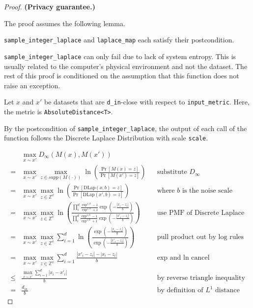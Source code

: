 \documentclass{article}
\begin{document}
\begin{proof} 
\textbf{(Privacy guarantee.)} 
    
\begin{tcolorbox}
    The proof assumes the following lemma.
    \begin{lemma}
        \texttt{sample\_integer\_laplace} and \texttt{laplace\_map} each satisfy their postcondition.
    \end{lemma}
\end{tcolorbox}

\texttt{sample\_integer\_laplace} can only fail due to lack of system entropy. 
This is usually related to the computer's physical environment and not the dataset. 
The rest of this proof is conditioned on the assumption that this function does not raise an exception. 

Let $x$ and $x'$ be datasets that are \texttt{d\_in}-close with respect to \texttt{input\_metric}.
Here, the metric is \texttt{AbsoluteDistance<T>}.

By the postcondition of \texttt{sample\_integer\_laplace},
the output of each call of the function follows the Discrete Laplace Distribution with scale \texttt{scale}.

\begin{align*}
    & \max_{x \sim x'} D_{\infty}(M(x), M(x'))  \\
    =& \max_{x \sim x'} \max_{z \in supp(M(\cdot))} \ln\left(\frac{\Pr\left[M(x) = z\right]}{\Pr\left[M(x') = z \right]}\right)
        &&\text{substitute } D_{\infty}\\
    =& \max_{x \sim x'} \max_{z \in \mathbb{Z^d}} \ln\left(\frac{\Pr\left[\mathrm{DLap}(x, b) = z \right]}{\Pr\left[\mathrm{DLap}(x', b) = z\right]}\right)
        &&\text{where } b \text{ is the noise scale} \\
    =& \max_{x \sim x'} \max_{z \in \mathbb{Z^d}} \ln\left(\frac{
        \prod_i^d \frac{\exp^{1/b} - 1}{\exp^{1/b} + 1} \exp \left( -\frac{|x_i - z_i|}{b} \right)
    }{
        \prod_i^d \frac{\exp^{1/b} - 1}{\exp^{1/b} + 1} \exp \left( -\frac{|x'_i - z_i|}{b} \right)
    }\right) 
        &&\text{use PMF of Discrete Laplace} \\
    =& \max_{x \sim x'} \max_{z \in \mathbb{Z^d}} \sum_{i=1}^d \ln\left(\frac{
    \exp \left( -\frac{|x_i - z_i|}{b} \right)
    }{
        \exp \left( -\frac{|x'_i - z_i|}{b} \right)
    }\right) &&\text{pull product out by log rules}\\
    =& \max_{x \sim x'} \max_{z \in \mathbb{Z^d}} \sum_{i=1}^d \frac{|x'_i - z_i| - |x_i - z_i|}{b}&& \text{exp and ln cancel} \\
    \leq& \frac{\max_{x \sim x'} \sum_{i=1}^d |x_i - x'_i|}{b} &&\text{by reverse triangle inequality} \\
    =& \frac{d_{in}}{b}  &&\text{by definition of } L^1 \text{ distance}
\end{align*}


\end{proof}
\end{document}
